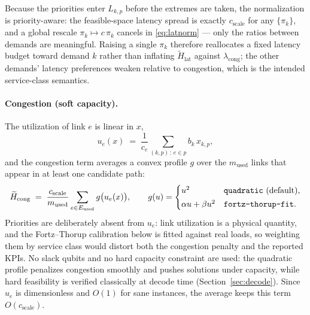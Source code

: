 \documentclass[11pt]{article}
\newcommand{\lat}{\mathrm{lat}}
\newcommand{\cng}{\mathrm{cong}}
\newcommand{\used}{\mathrm{used}}
\begin{document}
Because the priorities enter $L_{k,p}$ before the extremes are taken, the
normalization is priority-aware: the feasible-space latency spread is exactly
$c_{\mathrm{scale}}$ for any $\{\pi_k\}$, and a global rescale
$\pi_k \mapsto c\,\pi_k$ cancels in \eqref{eq:latnorm} --- only the ratios
between demands are meaningful. Raising a single $\pi_k$ therefore reallocates
a fixed latency budget toward demand $k$ rather than inflating
$\widetilde{H}_{\lat}$ against $\lambda_{\cng}$; the other demands' latency
preferences weaken relative to congestion, which is the intended service-class
semantics.

\paragraph{Congestion (soft capacity).}
The utilization of link $e$ is linear in $x$,
\begin{equation}
  u_e(x) \;=\; \frac{1}{c_e} \sum_{(k,p)\,:\, e \in p} b_k\, x_{k,p},
\end{equation}
and the congestion term averages a convex profile $g$ over the $m_{\used}$
links that appear in at least one candidate path:
\begin{equation}
  \label{eq:cong}
  \widetilde{H}_{\cng} \;=\; \frac{c_{\mathrm{scale}}}{m_{\used}}
      \sum_{e \in E_{\used}} g\bigl(u_e(x)\bigr),
  \qquad
  g(u) =
  \begin{cases}
    u^{2} & \text{\texttt{quadratic} (default)},\\[2pt]
    \alpha u + \beta u^{2} & \text{\texttt{fortz-thorup-fit}}.
  \end{cases}
\end{equation}
Priorities are deliberately absent from $u_e$: link utilization is a physical
quantity, and the Fortz--Thorup calibration below is fitted against real
loads, so weighting them by service class would distort both the congestion
penalty and the reported KPIs.
No slack qubits and no hard capacity constraint are used: the quadratic
profile penalizes congestion smoothly and pushes solutions under capacity,
while hard feasibility is verified classically at decode time
(Section~\ref{sec:decode}). Since $u_e$ is dimensionless and $O(1)$ for sane
instances, the average keeps this term $O(c_{\mathrm{scale}})$.
\end{document}
